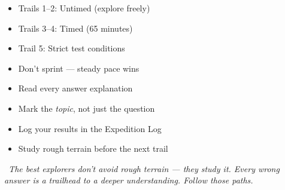 {%
\noindent
\begin{minipage}[t]{0.48\linewidth}
\begin{tcolorbox}[
    enhanced,
    colback=funTeal!6,
    colframe=funTeal!35,
    arc=8pt, boxrule=0.8pt,
    left=4mm, right=4mm, top=3mm, bottom=3mm,
    title={\small\textcolor{white}{\faClock~Pacing Your Trek}},
    colbacktitle=funTeal!55,
    fonttitle=\bfseries\sffamily,
    height=5cm,
    valign=center,
]
    \small
    \begin{itemize}[leftmargin=*, itemsep=2pt]
        \item Trails 1--2: Untimed (explore freely)
        \item Trails 3--4: Timed (65 minutes)
        \item Trail 5: Strict test conditions
        \item Don't sprint --- steady pace wins
    \end{itemize}
\end{tcolorbox}
\end{minipage}%
\hfill
\begin{minipage}[t]{0.48\linewidth}
\begin{tcolorbox}[
    enhanced,
    colback=funOrange!6,
    colframe=funOrange!35,
    arc=8pt, boxrule=0.8pt,
    left=4mm, right=4mm, top=3mm, bottom=3mm,
    title={\small\textcolor{white}{\faFlag~After Each Trail}},
    colbacktitle=funOrange!55,
    fonttitle=\bfseries\sffamily,
    height=5cm,
    valign=center,
]
    \small
    \begin{itemize}[leftmargin=*, itemsep=2pt]
        \item Read every answer explanation
        \item Mark the \textit{topic}, not just the question
        \item Log your results in the Expedition Log
        \item Study rough terrain before the next trail
    \end{itemize}
\end{tcolorbox}
\end{minipage}

\vspace{3mm}

\begin{tcolorbox}[
    enhanced,
    colback=funCream,
    colframe=funTeal!25,
    arc=12pt, boxrule=0.8pt,
    left=5mm, right=5mm, top=3mm, bottom=3mm,
]
    \begin{minipage}[c]{0.07\linewidth}
        \centering \iconOwl[1cm]
    \end{minipage}%
    \hfill
    \begin{minipage}[c]{0.90\linewidth}
        \small\itshape\color{funTealDark}
        \faQuoteLeft~The best explorers don't avoid rough terrain ---
        they study it. Every wrong answer is a trailhead to
        a deeper understanding. Follow those paths.~\faQuoteRight
    \end{minipage}
\end{tcolorbox}

}

\newpage
